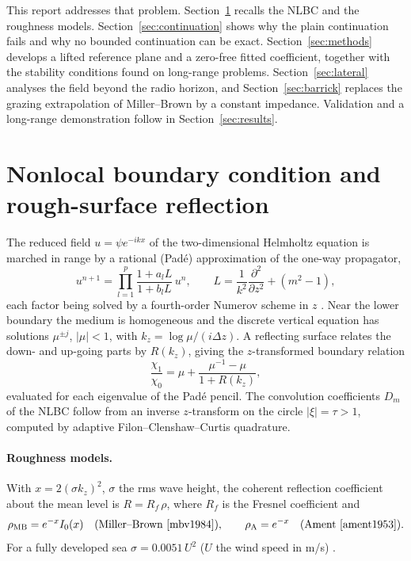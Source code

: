 \documentclass[11pt,a4paper]{article}
\newcommand{\kz}{k_z}
\newcommand{\rhoMB}{\rho_{\mathrm{MB}}}
\begin{document}
This report addresses that problem. Section~\ref{sec:nlbc} recalls the NLBC and the
roughness models. Section~\ref{sec:continuation} shows why the plain continuation
fails and why no bounded continuation can be exact. Section~\ref{sec:methods}
develops a lifted reference plane and a zero-free fitted coefficient, together with
the stability conditions found on long-range problems. Section~\ref{sec:lateral}
analyses the field beyond the radio horizon, and Section~\ref{sec:barrick} replaces the
grazing extrapolation of Miller--Brown by a constant impedance. Validation and a
long-range demonstration follow in Section~\ref{sec:results}.

\section{Nonlocal boundary condition and rough-surface reflection}\label{sec:nlbc}

The reduced field $u=\psi e^{-ikx}$ of the two-dimensional Helmholtz equation is
marched in range by a rational (Pad\'e) approximation of the one-way propagator,
\begin{equation}
  u^{n+1}=\prod_{l=1}^{p}\frac{1+a_l L}{1+b_l L}\,u^{n},\qquad
  L=\frac{1}{k^2}\frac{\partial^2}{\partial z^2}+\left(m^2-1\right),
\end{equation}
each factor being solved by a fourth-order Numerov scheme in $z$ \cite{collins1993,lytaev2022}.
Near the lower boundary the medium is homogeneous and the discrete vertical
equation has solutions $\mu^{\pm j}$, $|\mu|<1$, with $\kz=\log\mu/(i\Delta z)$.
A reflecting surface relates the down- and up-going parts by $R(\kz)$, giving the
$z$-transformed boundary relation
\begin{equation}
  \frac{\chi_1}{\chi_0}=\mu+\frac{\mu^{-1}-\mu}{1+R(\kz)},
\end{equation}
evaluated for each eigenvalue of the Pad\'e pencil. The convolution coefficients
$D_m$ of the NLBC follow from an inverse $z$-transform on the circle
$|\xi|=\tau>1$, computed by adaptive Filon--Clenshaw--Curtis quadrature.

\paragraph{Roughness models.}
With $x=2(\sigma\kz)^2$, $\sigma$ the rms wave height, the coherent reflection
coefficient about the mean level is $R=R_f\,\rho$, where $R_f$ is the Fresnel
coefficient and
\begin{equation}
  \rhoMB=e^{-x}I_0(x)\quad\text{(Miller--Brown \cite{mbv1984})},\qquad
  \rho_{\mathrm A}=e^{-x}\quad\text{(Ament \cite{ament1953})}.
\end{equation}
For a fully developed sea $\sigma=0.0051\,U^2$ ($U$ the wind speed in m/s) \cite{levy2000}.
\end{document}
